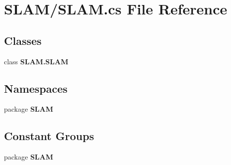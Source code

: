 \section{S\-L\-A\-M/\-S\-L\-A\-M.cs File Reference}
\label{_s_l_a_m_8cs}
\subsection*{Classes}
\begin{DoxyCompactItemize}
\item 
class {\bf S\-L\-A\-M.\-S\-L\-A\-M}
\end{DoxyCompactItemize}
\subsection*{Namespaces}
\begin{DoxyCompactItemize}
\item 
package {\bf S\-L\-A\-M}
\end{DoxyCompactItemize}
\subsection*{Constant Groups}
\begin{DoxyCompactItemize}
\item 
package {\bf S\-L\-A\-M}
\end{DoxyCompactItemize}
